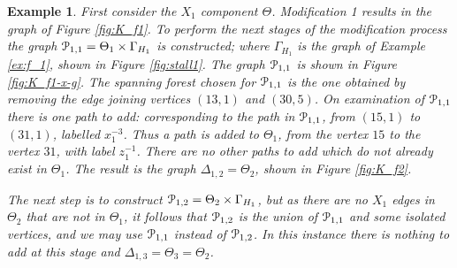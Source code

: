 \documentclass[a4paper,12pt]{article}
\newcommand{\G}{\Gamma }
\newcommand{\D}{\Delta }
\newcommand{\T}{\Theta }
\newcommand{\cP}{{\cal{P}}}
\newtheorem{exam}[theorem]{Example}
\newenvironment{example}{\begin{exam} \rm}{\end{exam}}
\numberwithin{equation}{section}
\numberwithin{figure}{section}
\begin{document}
\begin{example}
First consider the $X_1$ component $\Theta$. Modification 1
results in the graph of Figure \ref{fig:K_f1}. To perform the next
stages of the  modification process the graph  $\cP_{1,1}=\Theta_1 \times
\G_{H_1}$ is constructed; where $\G_{H_1}$ is the graph of Example
\ref{ex:f_1}, shown in Figure \ref{fig:stall1}. The  graph
$\cP_{1,1}$ is shown in Figure \ref{fig:K_f1-x-g}. The spanning forest
chosen for $\cP_{1,1}$ is the one obtained by removing the edge
joining vertices $(13,1)$ and $(30,5)$. On examination of $\cP_{1,1}$
there is one path to add: corresponding to the path in $\cP_{1,1}$,
from $(15,1)$ to $(31,1)$, labelled $x_1^{-3}$. Thus a path is
added to $\T_1$, from the vertex $15$ to the vertex $31$, with
label $z_1^{-1}$. There are no other paths to add which do not
already exist in $\T_1$. The result is  the graph $\D_{1,2}=\Theta_2$,
shown in Figure \ref{fig:K_f2}. 

The next step is to construct
$\cP_{1,2}=\T_2\times \G_{H_1}$, but as there are no $X_1$ edges in
$\T_2$ that are not in $\T_1$, it follows that  $\cP_{1,2}$ is the
union of $\cP_{1,1}$ and some isolated vertices, and we may use
$\cP_{1,1}$ instead of $\cP_{1,2}$. In this instance there is nothing to
add at this stage and $\D_{1,3}=\T_3=\T_2$.


\end{example}
\end{document}
